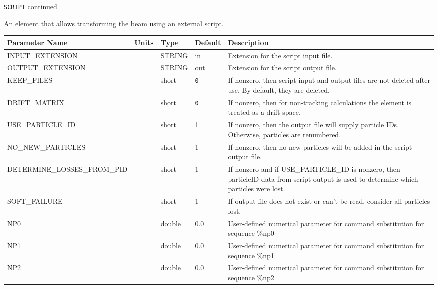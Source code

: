 \newpage
\begin{center}{\Large\verb|SCRIPT| continued}\end{center}
An element that allows transforming the beam using an external script.
\\
\begin{tabular}{|l|l|l|l|p{\descwidth}|} \hline
Parameter Name & Units & Type & Default & Description \\ \hline 
INPUT\_EXTENSION &  & STRING &   in              & Extension for the script input file.  \\ \hline 
OUTPUT\_EXTENSION &  & STRING &   out             & Extension for the script output file.  \\ \hline 
KEEP\_FILES &  & short &  \verb|0| & If nonzero, then script input and output files are not deleted after use.  By default, they are deleted.  \\ \hline 
DRIFT\_MATRIX &  & short &  \verb|0| & If nonzero, then for non-tracking calculations the element is treated as a drift space.  \\ \hline 
USE\_PARTICLE\_ID &  & short &   1               & If nonzero, then the output file will supply particle IDs. Otherwise, particles are renumbered.  \\ \hline 
NO\_NEW\_PARTICLES &  & short &   1               & If nonzero, then no new particles will be added in the script output file.  \\ \hline 
DETERMINE\_LOSSES\_FROM\_PID &  & short &   1               & If nonzero and if USE\_PARTICLE\_ID is nonzero, then particleID data from script output is used to determine which particles were lost.  \\ \hline 
SOFT\_FAILURE &  & short &   1               & If output file does not exist or can't be read, consider all particles lost.  \\ \hline 
NP0 &  & double &  0.0 & User-defined numerical parameter for command substitution for sequence \%np0  \\ \hline 
NP1 &  & double &  0.0 & User-defined numerical parameter for command substitution for sequence \%np1  \\ \hline 
NP2 &  & double &  0.0 & User-defined numerical parameter for command substitution for sequence \%np2  \\ \hline 
\end{tabular}

